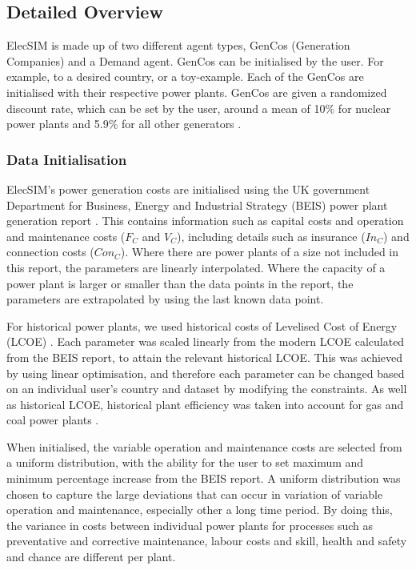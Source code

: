 \subsection{Detailed Overview}

ElecSIM is made up of two different agent types, GenCos (Generation Companies) and a Demand agent. GenCos can be initialised by the user. For example, to a desired country, or a toy-example. Each of the GenCos are initialised with their respective power plants. GenCos are given a randomized discount rate, which can be set by the user, around a mean of 10\% for nuclear power plants \cite{Paper2012} and 5.9\% for all other generators \cite{KPMG2017}.





\subsubsection{Data Initialisation}ElecSIM's power generation costs are initialised using the UK government Department for Business, Energy and Industrial Strategy (BEIS) power plant generation report \cite{Department2016}. This contains information such as capital costs and operation and maintenance costs ($F_C$ and $V_C$), including details such as insurance ($In_C$) and connection costs ($Con_C$). Where there are power plants of a size not included in this report, the parameters are linearly interpolated. Where the capacity of a power plant is larger or smaller than the data points in the report, the parameters are extrapolated by using the last known data point.

For historical power plants, we used historical costs of Levelised Cost of Energy (LCOE) \cite{Dale2013}. Each parameter was scaled linearly from the modern LCOE calculated from the BEIS report, to attain the relevant historical LCOE. This was achieved by using linear optimisation, and therefore each parameter can be changed based on an individual user's country and dataset by modifying the constraints. As well as historical LCOE, historical plant efficiency was taken into account for gas and coal power plants \cite{EIA2013}.

When initialised, the variable operation and maintenance costs are selected from a uniform distribution, with the ability for the user to set maximum and minimum percentage increase from the BEIS report. A uniform distribution was chosen to capture the large deviations that can occur in variation of variable operation and maintenance, especially other a long time period. By doing this, the variance in costs between individual power plants for processes such as preventative and corrective maintenance, labour costs and skill, health and safety and chance are different per plant.  

